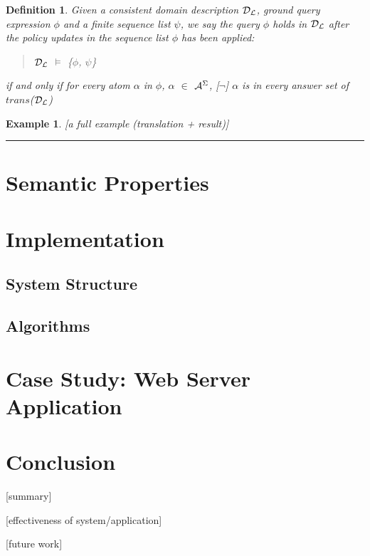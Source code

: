 \documentclass[10pt, twocolumn]{article}
\newtheorem{definition}{Definition}
\newtheorem{examp}{Example}
\newenvironment{example}{\begin{examp}\rm}{\rule{2mm}{2mm}\end{examp}}
\begin{document}
        \begin{definition}
          Given a consistent domain description ${\cal D}_{\cal L}$, ground
          query expression $\phi$ and a finite sequence list $\psi$, we say the
          query $\phi$ holds in ${\cal D}_{\cal L}$ after the policy updates
          in the sequence list $\phi$ has been applied:

          \begin{quote}
            ${\cal D}_{\cal L}$ $\models$ \{$\phi$, $\psi$\}
          \end{quote}

          \noindent if and only if for every atom $\alpha$ in $\phi$, $\alpha$
          $\in$ ${\cal A}^{\Sigma}$, [$\lnot$] $\alpha$ is in every answer
          set of $trans$(${\cal D}_{\cal L}$)
        \end{definition}

    \begin{example}
      [a full example (translation + result)]

    \end{example}

  \section{Semantic Properties}

  \section{Implementation}

    \subsection{System Structure}

    \subsection{Algorithms}

  \section{Case Study: Web Server Application}

  \section{Conclusion}

    [summary]

    [effectiveness of system/application]

    [future work]
\end{document}
